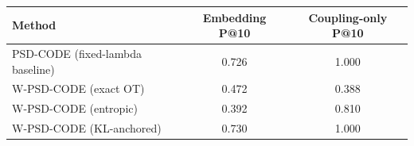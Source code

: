 \begin{tabular}{lcc}
\toprule
Method & Embedding P@10 & Coupling-only P@10 \\
\midrule
PSD-CODE (fixed-lambda baseline) & 0.726 & 1.000 \\
W-PSD-CODE (exact OT) & 0.472 & 0.388 \\
W-PSD-CODE (entropic) & 0.392 & 0.810 \\
W-PSD-CODE (KL-anchored) & 0.730 & 1.000 \\
\bottomrule
\end{tabular}
